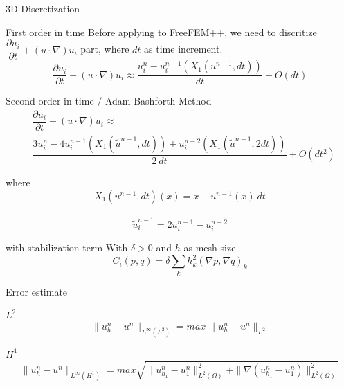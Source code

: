 \documentclass{beamer}
\begin{document}
\begin{frame}{3D Discretization}
\begin{block}{First order in time}
	Before applying to FreeFEM++, we need to discritize $ \dfrac{\partial u_{i}}{\partial t} + (u \cdot \nabla)u_{i} $ part, where $ dt $ as time increment.
	\[ \dfrac{\partial u_{i}}{\partial t} + (u \cdot \nabla)u_{i} \approx \dfrac{u_{i}^{n}-u_{i}^{n-1}(X_{1}(u^{n-1},dt))}{dt} + O(dt) \]
\end{block}
\begin{block}{Second order in time / Adam-Bashforth Method}
	\begin{eqnarray}\nonumber
		&\dfrac{\partial u_{i}}{\partial t} + (u \cdot \nabla)u_{i} \approx\\ \nonumber &\dfrac{3u_{i}^{n}-4u_{i}^{n-1}(X_{1}(\tilde{u}^{n-1},dt))+u_{i}^{n-2}(X_{1}(\tilde{u}^{n-1},2dt))}{2\ dt} + O(dt^2)
	\end{eqnarray}
\end{block}
\end{frame}

\begin{frame}
\begin{block}{where}
	\[ X_{1}(u^{n-1},dt)(x) = x - u^{n-1}(x)\ dt\]\\
	\[\tilde{u}^{n-1}_{i} = 2u_{i}^{n-1}-u_{i}^{n-2}\]
\end{block}
\begin{block}{with stabilization term}
	With $ \delta>0 $ and $ h $ as mesh size
	\[ C_{i}(p,q) = \delta \sum_{k} h_{k}^{2}(\nabla p, \nabla q)_{k} \]
\end{block}
\end{frame}

\begin{frame}{Error estimate}
\begin{block}{$ L^{2} $}
	\[\| u_{h}^{n}-u^{n} \|_{L^\infty(L^2)} =  max \ \| u_{h}^{n}-u^{n} \|_{L^{2}}\]
\end{block}
\begin{block}{$ H^{1} $}
	\[\| u_{h}^{n}-u^{n} \|_{L^\infty(H^{1})} = max \sqrt{\| u_{h_{1}}^{n}-u_{1}^{n} \|_{L^2(\Omega)}^{2} + \| \nabla (u_{h_{1}}^{n}-u_{1}^{n}) \|_{L^2(\Omega)}^{2}}\]
\end{block}
\end{frame}
\end{document}
